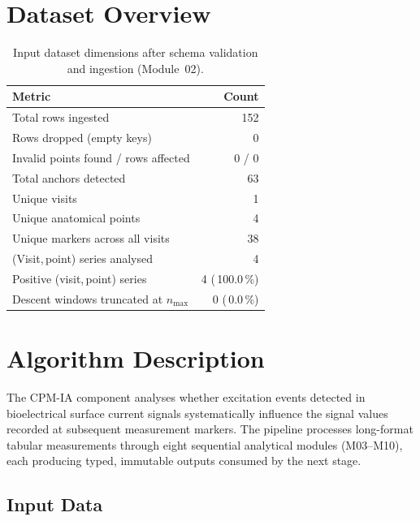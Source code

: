 \documentclass[a4paper,11pt]{article}
\begin{document}
\section{Dataset Overview}

\begin{table}[h!]
\centering
\small
\caption{Input dataset dimensions after schema validation and ingestion (Module~02).}
\begin{tabular}{lr}
\toprule
\textbf{Metric} & \textbf{Count} \\
\midrule
Total rows ingested                        & 152 \\
Rows dropped (empty keys)                  & 0 \\
Invalid points found / rows affected       & 0 / 0 \\
Total anchors detected                     & 63 \\
Unique visits                          & 1 \\
Unique anatomical points               & 4 \\
Unique markers across all visits       & 38 \\
(Visit,\,point) series analysed        & 4 \\
Positive (visit,\,point) series        & 4 (\,100.0\,\%) \\
Descent windows truncated at $n_{\max}$ & 0 (\,0.0\,\%) \\
\bottomrule
\end{tabular}
\end{table}

\section{Algorithm Description}

The CPM-IA component analyses whether excitation events detected in bioelectrical surface
current signals systematically influence the signal values recorded at subsequent measurement
markers. The pipeline processes long-format tabular measurements through eight sequential
analytical modules (M03--M10), each producing typed, immutable outputs consumed by the next
stage.

\subsection{Input Data}
\end{document}
